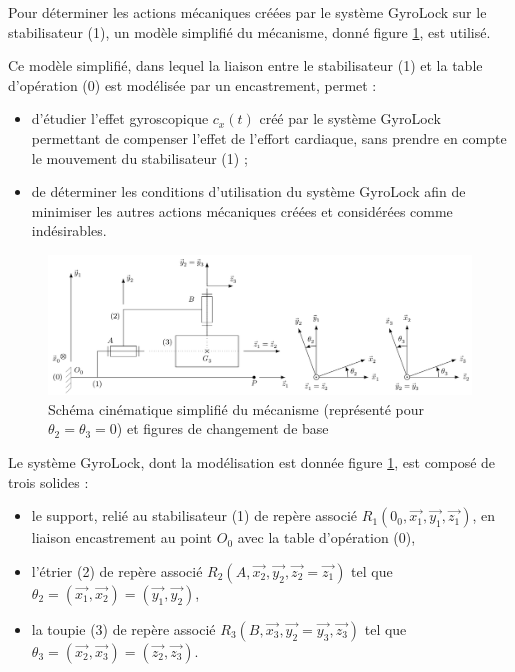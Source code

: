 Pour déterminer les actions mécaniques créées par le système GyroLock sur le stabilisateur (1), un modèle simplifié du mécanisme, donné figure \ref{fig06}, est utilisé.

Ce modèle simplifié, dans lequel la liaison entre le stabilisateur (1) et la table d'opération (0) est modélisée par un encastrement, permet : 
\begin{itemize}
 \item d'étudier l'effet gyroscopique $c_x(t)$ créé par le système GyroLock permettant de compenser l'effet de l'effort cardiaque, sans prendre en compte le mouvement du stabilisateur (1) ; 
 \item de déterminer les conditions d'utilisation du système GyroLock afin de minimiser les autres actions méca­niques créées et considérées comme indésirables. 
\end{itemize}

\begin{figure}[ht]
\begin{center}
\includegraphics[width=0.8\linewidth]{img/fig06}
\caption{Schéma cinématique simplifié du mécanisme (représenté pour $\theta_2=\theta_3=0$) et figures de changement de base }
\label{fig06}
\end{center}
\end{figure}

Le système GyroLock, dont la modélisation est donnée figure \ref{fig06}, est composé de trois solides :
\begin{itemize}
 \item le support, relié au stabilisateur (1) de repère associé $R_1(0_0,\overrightarrow{x_1},\overrightarrow{y_1},\overrightarrow{z_1})$, en liaison encastrement au point $O_0$ avec la table d'opération (0),
 \item l'étrier (2) de repère associé $R_2(A,\overrightarrow{x_2},\overrightarrow{y_2},\overrightarrow{z_2}=\overrightarrow{z_1})$ tel que $\theta_2=(\overrightarrow{x_1},\overrightarrow{x_2})=(\overrightarrow{y_1},\overrightarrow{y_2})$,
 \item la toupie (3) de repère associé $R_3(B,\overrightarrow{x_3},\overrightarrow{y_2}=\overrightarrow{y_3},\overrightarrow{z_3})$ tel que $\theta_3=(\overrightarrow{x_2},\overrightarrow{x_3})=(\overrightarrow{z_2},\overrightarrow{z_3})$.
\end{itemize}


